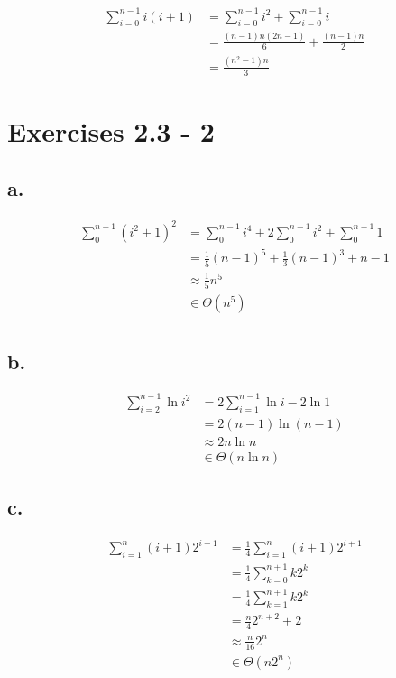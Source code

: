 \documentclass{article}
\begin{document}
\begin{align*}
\sum_{i=0}^{n-1}i(i+1) &=  \sum_{i=0}^{n-1}i^2 + \sum_{i=0}^{n-1}i\\
&= \frac{(n-1)n(2n-1)}{6} + \frac{(n-1)n}{2} \\
&= \frac{(n^2-1)n}{3}
\end{align*}

\section{Exercises 2.3 - 2}

\subsection{a.}

\begin{align*}
\sum_{0}^{n-1}(i^2+1)^2&= \sum_{0}^{n-1}i^4 + 2\sum_{0}^{n-1}i^2 + \sum_{0}^{n-1}1 \\
&= \frac{1}{5}(n-1)^5+\frac{1}{3}(n-1)^3+ n-1 \\
&\approx \frac{1}{5}n^5  \\
&\in \Theta(n^5) \\
\end{align*}

\subsection{b.}

\begin{align*}
\sum_{i=2}^{n-1}\ln i^2&= 2\sum_{i=1}^{n-1}\ln i - 2\ln 1\\
&= 2(n-1)\ln(n-1)\\
&\approx 2n\ln n  \\
& \in \Theta (n \ln n)
\end{align*}

\subsection{c.}

\begin{align*}
\sum_{i=1}^{n}(i+1)2^{i-1}&= \frac{1}{4}\sum_{i=1}^{n}(i+1)2^{i+1}\\
&= \frac{1}{4}\sum_{k=0}^{n+1}k2^k\\
&= \frac{1}{4}\sum_{k=1}^{n+1}k2^k\\
&= \frac{n}{4}2^{n+2} +2 \\
& \approx \frac{n}{16}2^n \\
& \in\Theta (n2^n)
\end{align*}
\end{document}
